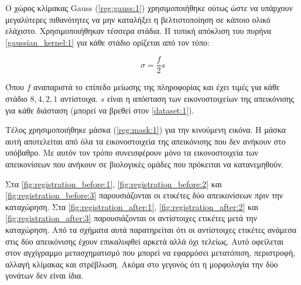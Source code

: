 \documentclass[a4paper,12pt]{article}
\begin{document}
Ο χώρος κλίμακας Gauss (\ref{reg:gauss:1}) χρησιμοποιήθηκε ούτως ώστε να
υπάρχουν μεγαλύτερες πιθανότητες να μην καταλήξει η βελτιστοποίηση σε κάποιο
ολικό ελάχιστο. Χρησιμοποιήθηκαν τέσσερα στάδια. Η τυπική απόκλιση του πυρήνα
\eqref{gaussian_kernel:1} για κάθε στάδιο ορίζεται από τον τύπο:

\begin{equation} \label{standard_deviation:1}
    \sigma = \frac {f} {2} s
\end{equation}

Όπου $f$ αναπαριστά το επίπεδο μείωσης της πληροφορίας και έχει τιμές για κάθε
στάδιο $8,4,2,1$ αντίστοιχα. $s$ είναι η απόσταση των εικονοστοιχείων της
απεικόνισης για κάθε διάσταση (μπορεί να βρεθεί στον \autoref{dataset:1}).

Τέλος χρησιμοποιήθηκε μάσκα (\ref{reg:mask:1}) για την κινούμενη εικόνα. Η μάσκα
αυτή αποτελείται από όλα τα εικονοστοιχεία της απεικόνισης που δεν ανήκουν στο
υπόβαθρο. Με αυτόν τον τρόπο συνεισφέρουν μόνο τα εικονοστοιχεία των
απεικονίσεων που ανήκουν σε βιολογικές ομάδες που πρόκειται να κατανεμηθούν.

Στα \autoref{fig:registration_before:1}, \autoref{fig:registration_before:2} και
\autoref{fig:registration_before:3} παρουσιάζονται οι ετικέτες δύο απεικονίσεων
πριν την καταχώρηση. Στα \autoref{fig:registration_after:1},
\autoref{fig:registration_after:2} και \autoref{fig:registration_after:3}
παρουσιάζονται οι αντίστοιχες ετικέτες μετά την καταχώρηση. Από τα σχήματα αυτά
παρατηρείται ότι οι αντίστοιχες ετικέτες ανάμεσα στις δύο απεικόνισης έχουν
επικαλυφθεί αρκετά αλλά όχι τελείως. Αυτό οφείλεται στον αγχίγραμμο
μετασχηματισμό που μπορεί να εφαρμόσει μετατόπιση, περιστροφή, αλλαγή κλίμακας
και στρέβλωση. Ακόμα στο γεγονός ότι η μορφολογία την δύο γονάτων δεν είναι
ίδια.
\end{document}
